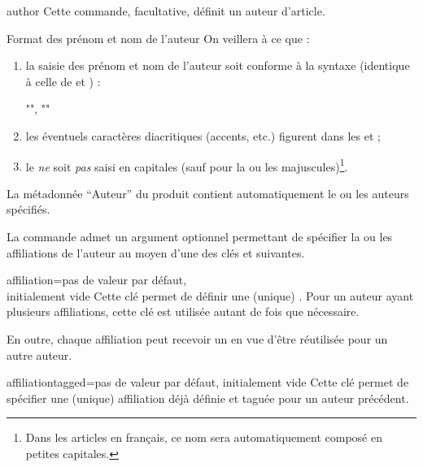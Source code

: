 \documentclass[english,nolocaltoc]{nwejmart}
\newtheorem[style=definition]{fait}
\newtheorem[title=expérience]{experience}
\newtheorem[title-plural=anneaux]{anneau}
\newtheorem[title=idéal,title-plural=idéaux]{ideal}
\begin{document}
\begin{docCommand}{author}{}
  Cette commande, facultative, définit un auteur d'article.
\end{docCommand}
%
\begin{dbwarning}{Format des prénom et nom de l'auteur}{}
  On veillera à ce que :
  \begin{enumerate}
  \item la saisie des prénom et nom de l'auteur soit conforme à la syntaxe
    (identique à celle de  et ) :
\begin{bodycode}[listing options={showspaces}]
"", ""
\end{bodycode}
  \item les éventuels caractères diacritiques (accents, etc.) figurent dans les
     et  ;
  \item le  \emph{ne} soit \emph{pas} saisi en capitales (sauf pour la
    ou les majuscules)\footnote{Dans les articles en français, ce nom sera
      automatiquement composé en petites capitales.}.
  \end{enumerate}

  La métadonnée \enquote{Auteur} du  produit contient automatiquement
  le ou les auteurs spécifiés.
\end{dbwarning}

La commande  admet un argument optionnel permettant de spécifier
la ou les affiliations de l'auteur au moyen d'une des clés 
et  suivantes.

\begin{docKey}{affiliation}{={}}{pas de valeur par défaut,\\initialement vide}
  Cette clé permet de définir une (unique) . Pour un auteur
  ayant plusieurs affiliations, cette clé est utilisée autant de fois que
  nécessaire.

  En outre, chaque affiliation peut recevoir un  en vue d'être
  réutilisée pour un autre auteur.
\end{docKey}

\begin{docKey}{affiliationtagged}{={}}{pas de valeur par défaut,
    initialement vide}
  Cette clé permet de spécifier une (unique) affiliation déjà définie et taguée
  pour un auteur précédent.
\end{docKey}
\end{document}
